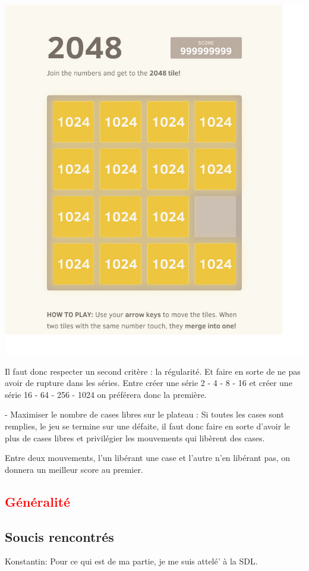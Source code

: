 \documentclass{article}
\begin{document}
\includegraphics[scale=0.2]{../image.png}

Il faut donc respecter un second critère : la régularité. Et faire en sorte de ne pas avoir de rupture dans les séries. Entre créer une série 2 - 4 - 8 - 16 et créer une série 16 - 64 - 256 - 1024 on préférera donc la première.

- Maximiser le nombre de cases libres sur le plateau : Si toutes les cases sont remplies, le jeu se termine sur une défaite, il faut donc faire en sorte d'avoir le plus de cases libres et privilégier les mouvements qui libèrent des cases.

Entre deux mouvements, l'un libérant une case et l'autre n'en libérant pas, on donnera un meilleur score au premier.

\textcolor{red}{\section{Généralité}}


\subsection{Soucis rencontrés}
Konstantin: Pour ce qui est de ma partie, je me suis attel\'e' \`a la SDL.
\end{document}
